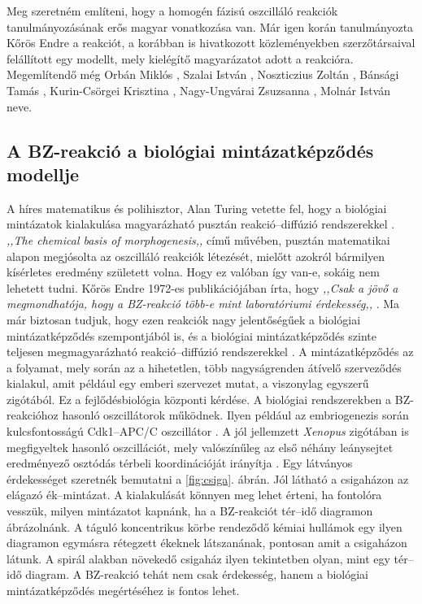Meg szeretném említeni, hogy a homogén fázisú oszcilláló reakciók tanulmányozásának erős magyar vonatkozása van. Már igen korán tanulmányozta Kőrös Endre a reakciót, a korábban is hivatkozott közleményekben \cite{field1974oscillations, noyes1972oscillations} szerzőtársaival felállított egy modellt, mely kielégítő magyarázatot adott a reakcióra. Megemlítendő még Orbán Miklós \cite{miklososzcillalo}, Szalai István \cite{molnar2015pattern}, Noszticzius Zoltán \cite{noszticzius1987sustained}, Bánsági Tamás \cite{bansagi2011tomography}, Kurin-Csörgei Krisztina \cite{orban2015ph}, Nagy-Ungvárai Zsuzsanna \cite{nagy1991control}, Molnár István \cite{molnar2015pattern} neve.

\subsection{A BZ-reakció a biológiai mintázatképződés modellje}

A híres matematikus és polihisztor, Alan Turing vetette fel, hogy a biológiai mintázatok kialakulása magyarázható pusztán reakció--diffúzió rendszerekkel \cite{turing1952chemical}. \emph{,,The chemical basis of morphogenesis,,} című művében, pusztán matematikai alapon megjósolta az oszcilláló reakciók létezését, mielőtt azokról bármilyen kísérletes eredmény született volna. Hogy ez valóban így van-e, sokáig nem lehetett tudni. Kőrös Endre 1972-es publikációjában írta, hogy \emph{,,Csak a jövő a megmondhatója, hogy a BZ-reakció több-e mint laboratóriumi érdekesség,,} \cite{field1972oscillations}. Ma már biztosan tudjuk, hogy ezen reakciók nagy jelentőségűek a biológiai mintázatképződés szempontjából is, és a biológiai mintázatképződés szinte teljesen megmagyarázható reakció--diffúzió rendszerekkel \cite{kondo2010reaction}. A mintázatképződés az a folyamat, mely során az a hihetetlen, több nagyságrenden átívelő szerveződés kialakul, amit például egy emberi szervezet mutat, a viszonylag egyszerű zigótából. Ez a fejlődésbiológia központi kérdése. A biológiai rendszerekben a BZ-reakcióhoz hasonló oszcillátorok működnek. Ilyen például az embriogenezis során kulcsfontosságú Cdk1--APC/C oszcillátor \cite{yang2013cdk1}. A jól jellemzett \emph{Xenopus} zigótában is megfigyeltek hasonló oszcillációt, mely valószínűleg az első néhány leánysejtet eredményező osztódás térbeli koordinációját irányítja \cite{chang2013mitotic}. Egy látványos érdekességet szeretnék bemutatni a \ref{fig:csiga}. ábrán. Jól látható a csigaházon az elágazó ék--mintázat. A kialakulását könnyen meg lehet érteni, ha fontolóra vesszük, milyen mintázatot kapnánk, ha a BZ-reakciót tér--idő diagramon ábrázolnánk. A táguló koncentrikus körbe rendeződő kémiai hullámok egy ilyen diagramon egymásra rétegzett ékeknek látszanának, pontosan amit a csigaházon látunk. A spirál alakban növekedő csigaház ilyen tekintetben olyan, mint egy tér--idő diagram. A BZ-reakció tehát nem csak érdekesség, hanem a biológiai mintázatképződés megértéséhez is fontos lehet.

